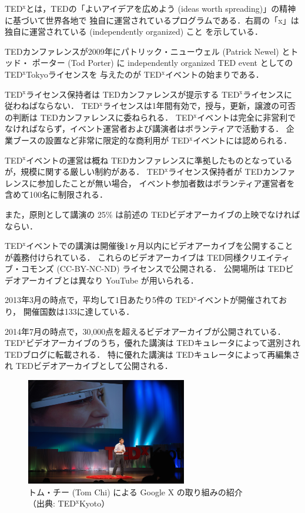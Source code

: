 \documentclass[submit,techreq,jkeyword,noauthor]{ipsj}
\newcommand{\TED}{\textrm{TED}}
\newcommand{\TEDx}{\TED${}^{\textrm{x}}$}
\newcommand{\TEDxTokyo}{\TEDx\textrm{Tokyo}}
\newcommand{\TEDxKyoto}{\TEDx\textrm{Kyoto}}
\begin{document}
\TEDx とは，\TED の「よいアイデアを広めよう (ideas worth spreading)」の精神に基づいて世界各地で
独自に運営されているプログラムである．右肩の「x」は独自に運営されている (independently organized) こと
を示している．

\TED カンファレンスが2009年にパトリック・ニューウェル (Patrick Newel) とトッド・
ポーター (Tod Porter) に independently organized TED event としての \TEDxTokyo ライセンスを
与えたのが \TEDx イベントの始まりである．

\TEDx ライセンス保持者は \TED カンファレンスが提示する \TEDx ライセンス\cite{tedxrules}に
従わねばならない．
\TEDx ライセンスは1年間有効で，授与，更新，譲渡の可否の判断は \TED カンファレンスに委ねられる．
\TEDx イベントは完全に非営利でなければならず，イベント運営者および講演者はボランティアで活動する．
企業ブースの設置など非常に限定的な商利用が \TEDx イベントには認められる．

\TEDx イベントの運営は概ね \TED カンファレンスに準拠したものとなっているが，規模に関する厳しい制約がある．
\TEDx ライセンス保持者が \TED カンファレンスに参加したことが無い場合，
イベント参加者数はボランティア運営者を含めて100名に制限される．

また，原則として講演の 25\% は前述の \TED ビデオアーカイブの上映でなければならい．

\TEDx イベントでの講演は開催後1ヶ月以内にビデオアーカイブを公開することが義務付けられている．
これらのビデオアーカイブは \TED 同様クリエイティブ・コモンズ (CC-BY-NC-ND) ライセンスで公開される．
公開場所は \TED ビデオアーカイブとは異なり YouTube が用いられる．


2013年3月の時点で，平均して1日あたり5件の \TEDx イベントが開催されており，
開催国数は133に達している．\cite{nh,mf}

2014年7月の時点で，30,000点を超えるビデオアーカイブが公開されている．
\TEDx ビデオアーカイブのうち，優れた講演は \TED キュレータによって選別され \TED ブログに転載される．
特に優れた講演は \TED キュレータによって再編集され \TED ビデオアーカイブとして公開される．\cite{tedxtalksweb}

\begin{figure}[t]
\begin{center}
\includegraphics[width=7cm,clip]{tom_chi.png}
\end{center}
\caption{トム・チー (Tom Chi) による Google X の取り組みの紹介\\
（出典: \TEDxKyoto ）}
\label{fig:tomchi}
\end{figure}
\end{document}
